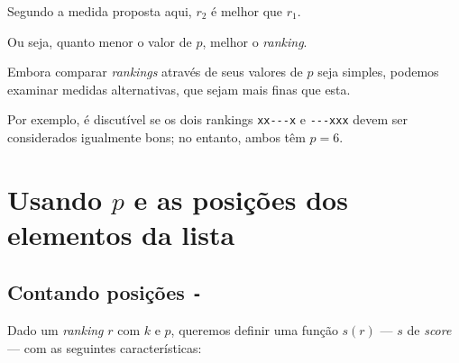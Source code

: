 \documentclass[
  letterpaper,
  DIV=11,
  numbers=noendperiod]{scrreprt}
\begin{document}
Segundo a medida proposta aqui, $r_2$ é melhor que $r_1$.

Ou seja, quanto menor o valor de $p$, melhor o \emph{ranking}.

Embora comparar \emph{rankings} através de seus valores de $p$ seja
simples, podemos examinar medidas alternativas, que sejam mais finas que
esta.

Por exemplo, é discutível se os dois rankings \texttt{xx-\/-\/-x} e
\texttt{-\/-\/-xxx} devem ser considerados igualmente bons; no entanto,
ambos têm $p = 6$.

\section{\texorpdfstring{Usando $p$ e as posições dos elementos da
lista}{Usando  e as posições dos elementos da lista}}\label{usando-p-e-as-posiuxe7uxf5es-dos-elementos-da-lista}

\subsection{\texorpdfstring{Contando posições
\texttt{-}}{Contando posições -}}\label{contando-posiuxe7uxf5es--}

Dado um \emph{ranking} $r$ com $k$ e $p$, queremos definir uma função
$s(r)$ --- $s$ de \emph{score} --- com as seguintes características:
\end{document}
